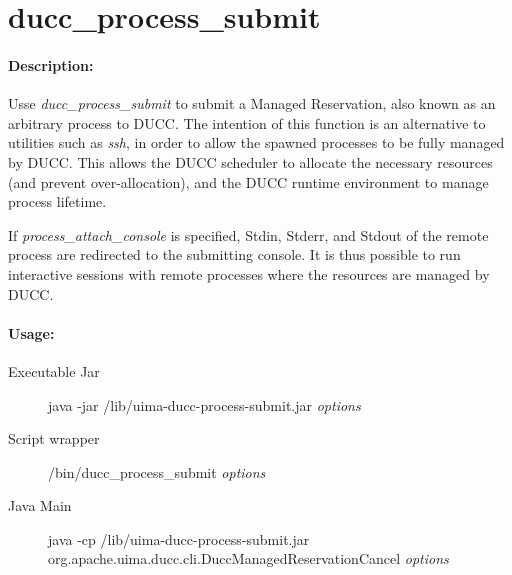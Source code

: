 \ifpdf
\else
{}
\fi
    \section{ducc\_process\_submit}
    \label{sec:cli.ducc-process-submit}
    \paragraph{Description:}
       Usse {\em ducc\_process\_submit} to submit a Managed Reservation, also known as an
       arbitrary process to DUCC.  The intention
       of this function is an alternative to utilities such as {\em ssh}, in order to allow the
       spawned processes to be fully managed by DUCC.  This allows the DUCC scheduler to allocate
       the necessary resources (and prevent over-allocation), and the DUCC runtime environment
       to manage process lifetime.

       If {\em process\_attach\_console} is specified, Stdin, Stderr, and Stdout of the remote
       process are redirected to the submitting console.  It is thus possible to run interactive
       sessions with remote processes where the resources are managed by DUCC.

    \paragraph{Usage:}
    \begin{description}
    \item[Executable Jar] java -jar \ducchome/lib/uima-ducc-process-submit.jar {\em options}
    \item[Script wrapper] \ducchome/bin/ducc\_process\_submit {\em options}
    \item[Java Main]      java -cp \ducchome/lib/uima-ducc-process-submit.jar org.apache.uima.ducc.cli.DuccManagedReservationCancel {\em options}
    \end{description}

